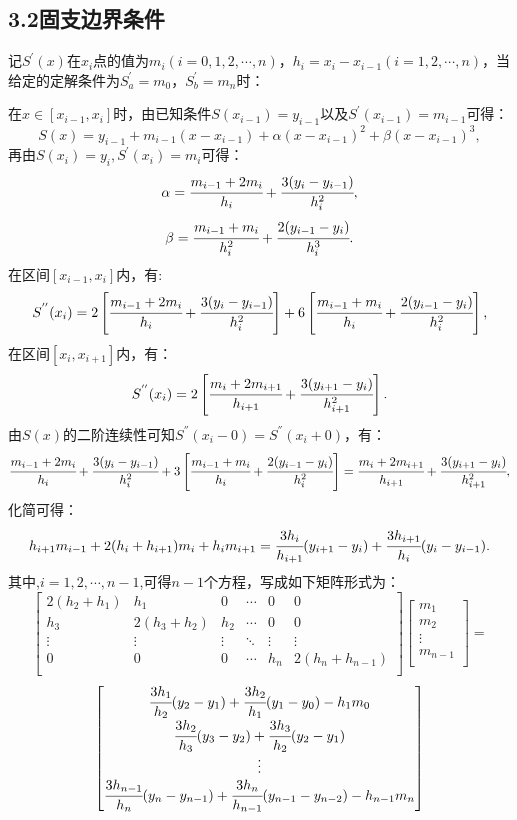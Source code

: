 \documentclass[12pt]{article}
\begin{document}
\subsection*{{\normalsize 3.2}\quad\normalsize\heiti 固支边界条件}

记$S^{'}(x)$在$x_{i}$点的值为$m_{i}(i=0,1,2,\cdots,n)$，$h_{i}=x_{i}-x_{i-1}(i=1,2,\cdots,n)$，当给定的定解条件为$S^{'}_{a}=m_0$，$S^{'}_{b}=m_n$时：
\par 在$x\in{[x_{i-1},x_{i}]}$时，由已知条件$S(x_{i-1})=y_{i-1}$以及$S^{'}(x_{i-1})=m_{i-1}$可得：
$$S(x)=y_{i-1}+m_{i-1}(x-x_{i-1})+\alpha(x-x_{i-1})^{2}+\beta(x-x_{i-1})^{3},$$
再由$S(x_{i})=y_{i},S^{'}(x_{i})=m_{i}$可得：
$$\alpha=\cfrac{m_{i-1}+2m_{i}}{h_{i}}+\cfrac{3(y_{i}-y_{i-1})}{h_{i}^{2}},$$
$$\beta=\cfrac{m_{i-1}+m_{i}}{h_{i}^{2}}+\cfrac{2(y_{i-1}-y_{i})}{h_{i}^{3}}.$$
在区间$[x_{i-1},x_{i}]$内，有:
$$S^{''}(x_{i})=2\left[\cfrac{m_{i-1}+2m_{i}}{h_{i}}+\cfrac{3(y_{i}-y_{i-1})}{h_{i}^{2}}\right]+6\left[\cfrac{m_{i-1}+m_{i}}{h_{i}}+\cfrac{2(y_{i-1}-y_{i})}{h_{i}^{2}}\right ],$$
在区间$[x_{i},x_{i+1}]$内，有：
$$S^{''}(x_{i})=2\left [\cfrac{m_{i}+2m_{i+1}}{h_{i+1}}+\cfrac{3(y_{i+1}-y_{i})}{h_{i+1}^{2}}\right ].$$
由$S(x)$的二阶连续性可知$S^{''}(x_{i}-0)=S^{''}(x_{i}+0)$，有：
$$\cfrac{m_{i-1}+2m_{i}}{h_{i}}+\cfrac{3(y_{i}-y_{i-1})}{h_{i}^{2}}+3\left [\cfrac{m_{i-1}+m_{i}}{h_{i}}+\cfrac{2(y_{i-1}-y_{i})}{h_{i}^{2}}\right ]=\cfrac{m_{i}+2m_{i+1}}{h_{i+1}}+\cfrac{3(y_{i+1}-y_{i})}{h_{i+1}^{2}},
$$
化简可得：
\begin{equation}\label{6}
h_{i+1}m_{i-1}+2(h_{i}+h_{i+1})m_{i}+h_{i}m_{i+1}=\cfrac{3h_{i}}{h_{i+1}}(y_{i+1}-y_{i})+\cfrac{3h_{i+1}}{h_{i}}(y_{i}-y_{i-1}).
\end{equation}
其中,$i=1,2,\cdots,n-1$,可得$n-1$个方程，写成如下矩阵形式为：
$$
\left[ \begin{matrix}
2(h_{2}+h_{1}) & h_{1} & 0 & \cdots & 0 & 0\\
h_{3} & 2(h_{3}+h_{2}) & h_{2} & \cdots & 0 & 0\\
\vdots & \vdots & \vdots & \ddots &\vdots &\vdots\\
0 & 0 & 0 &\cdots & h_{n} & 2(h_{n}+h_{n-1})\\
\end{matrix} \right]
\left[ \begin{matrix}
m_{1} \\
m_{2} \\
\vdots \\
m_{n-1} \\
\end{matrix} \right]
=$$
\begin{equation}\label{7}
\left[ \begin{matrix}
\cfrac{3h_{1}}{h_{2}}(y_{2}-y_{1})+\cfrac{3h_{2}}{h_{1}}(y_{1}-y_{0})-h_{1}m_{0}\\
\cfrac{3h_{2}}{h_{3}}(y_{3}-y_{2})+\cfrac{3h_{3}}{h_{2}}(y_{2}-y_{1})\\
\vdots\\
\cfrac{3h_{n-1}}{h_{n}}(y_{n}-y_{n-1})+\cfrac{3h_{n}}{h_{n-1}}(y_{n-1}-y_{n-2})-h_{n-1}m_{n}\\
\end{matrix} \right]
\end{equation}
\end{document}

